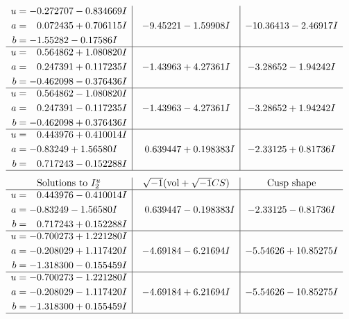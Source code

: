 \documentclass[1p]{elsarticle_modified}
\theoremstyle{definition}
\newcommand{\I}{\sqrt{-1}}
\begin{document}
$$\begin{array}{c|c|c}
\begin{aligned}
u &= -0.272707 - 0.834669 I \\
a &= \phantom{-}0.072435 + 0.706115 I \\
b &= -1.55282 - 0.17586 I\end{aligned}
 & -9.45221 - 1.59908 I & -10.36413 - 2.46917 I \\ \hline\begin{aligned}
u &= \phantom{-}0.564862 + 1.080820 I \\
a &= \phantom{-}0.247391 + 0.117235 I \\
b &= -0.462098 - 0.376436 I\end{aligned}
 & -1.43963 + 4.27361 I & -3.28652 - 1.94242 I \\ \hline\begin{aligned}
u &= \phantom{-}0.564862 - 1.080820 I \\
a &= \phantom{-}0.247391 - 0.117235 I \\
b &= -0.462098 + 0.376436 I\end{aligned}
 & -1.43963 - 4.27361 I & -3.28652 + 1.94242 I \\ \hline\begin{aligned}
u &= \phantom{-}0.443976 + 0.410014 I \\
a &= -0.83249 + 1.56580 I \\
b &= \phantom{-}0.717243 - 0.152288 I\end{aligned}
 & \phantom{-}0.639447 + 0.198383 I & -2.33125 + 0.81736 I\\
 \hline 
 \end{array}$$\newpage$$\begin{array}{c|c|c}  
\text{Solutions to }I^u_{2}& \I (\text{vol} + \sqrt{-1}CS) & \text{Cusp shape}\\
 \hline 
\begin{aligned}
u &= \phantom{-}0.443976 - 0.410014 I \\
a &= -0.83249 - 1.56580 I \\
b &= \phantom{-}0.717243 + 0.152288 I\end{aligned}
 & \phantom{-}0.639447 - 0.198383 I & -2.33125 - 0.81736 I \\ \hline\begin{aligned}
u &= -0.700273 + 1.221280 I \\
a &= -0.208029 + 1.117420 I \\
b &= -1.318300 - 0.155459 I\end{aligned}
 & -4.69184 - 6.21694 I & -5.54626 + 10.85275 I \\ \hline\begin{aligned}
u &= -0.700273 - 1.221280 I \\
a &= -0.208029 - 1.117420 I \\
b &= -1.318300 + 0.155459 I\end{aligned}
 & -4.69184 + 6.21694 I & -5.54626 - 10.85275 I\\
 \hline 
 \end{array}$$\newpage
\end{document}
